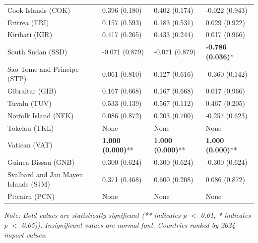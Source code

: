\begin{longtable}{p{4cm}p{3cm}p{3cm}p{3cm}}
Cook Islands (COK) & 0.396 (0.180) & 0.402 (0.174) & -0.022 (0.943) \\
Eritrea (ERI) & 0.157 (0.593) & 0.183 (0.531) & 0.029 (0.922) \\
Kiribati (KIR) & 0.417 (0.265) & 0.433 (0.244) & 0.017 (0.966) \\
South Sudan (SSD) & -0.071 (0.879) & -0.071 (0.879) & \textbf{-0.786 (0.036)}* \\
Sao Tome and Principe (STP) & 0.061 (0.810) & 0.127 (0.616) & -0.360 (0.142) \\
Gibraltar (GIB) & 0.167 (0.668) & 0.167 (0.668) & 0.017 (0.966) \\
Tuvalu (TUV) & 0.533 (0.139) & 0.567 (0.112) & 0.467 (0.205) \\
Norfolk Island (NFK) & 0.086 (0.872) & 0.203 (0.700) & -0.257 (0.623) \\
Tokelau (TKL) & None & None & None \\
Vatican (VAT) & \textbf{1.000 (0.000)}** & \textbf{1.000 (0.000)}** & \textbf{1.000 (0.000)}** \\
Guinea-Bissau (GNB) & 0.300 (0.624) & 0.300 (0.624) & -0.300 (0.624) \\
Svalbard and Jan Mayen Islands (SJM) & 0.371 (0.468) & 0.600 (0.208) & 0.086 (0.872) \\
Pitcairn (PCN) & None & None & None \\
\end{longtable}

\textit{Note: Bold values are statistically significant (** indicates p $<$ 0.01, * indicates p $<$ 0.05)). Insignificant values are normal font. Countries ranked by 2024 import values.}